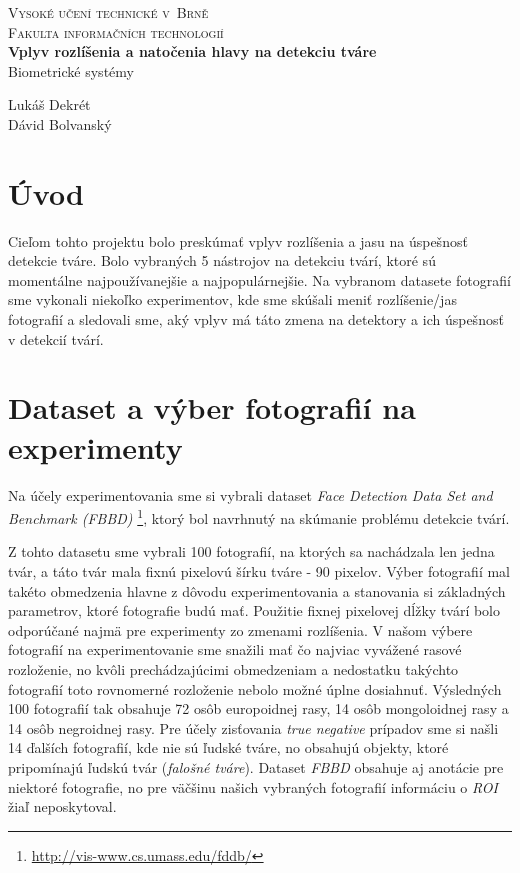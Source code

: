 \documentclass[]{article}
\begin{document}
	
	\begin{titlepage}
		\begin{center}
			\textsc{{\LARGE Vysoké učení technické v~Brně\\[0.3em]
					Fakulta informačních technologií}}\\
			{\Huge \textbf{Vplyv rozlíšenia a natočenia hlavy na detekciu tváre}\\[0.5em]}
			\Large{Biometrické systémy}
		\end{center}
		
		{\noindent \large Lukáš Dekrét\\Dávid Bolvanský}
	\end{titlepage}
	
	\section{Úvod}
	Cieľom tohto projektu bolo preskúmať vplyv rozlíšenia a jasu na úspešnosť detekcie tváre. Bolo vybraných 5 nástrojov na detekciu tvárí, ktoré sú momentálne najpoužívanejšie a najpopulárnejšie. Na vybranom datasete fotografií sme vykonali niekoľko experimentov, kde sme skúšali meniť rozlíšenie/jas fotografií a sledovali sme, aký vplyv má táto zmena na detektory a ich úspešnosť v detekcií tvárí.
	
	\section{Dataset a výber fotografií na experimenty}
	Na účely experimentovania sme si vybrali dataset \textit{Face Detection Data Set and Benchmark  (FBBD)} \footnote{\url{http://vis-www.cs.umass.edu/fddb/}}, ktorý bol navrhnutý na skúmanie problému detekcie tvárí.
	
	Z tohto datasetu sme vybrali 100 fotografií, na ktorých sa nachádzala len jedna tvár, a táto tvár mala fixnú pixelovú šírku tváre \-- 90 pixelov. Výber fotografií mal takéto obmedzenia hlavne z dôvodu experimentovania a stanovania si základných parametrov, ktoré fotografie budú mať. Použitie fixnej pixelovej dĺžky tvárí bolo odporúčané najmä pre experimenty zo zmenami rozlíšenia.
	V našom výbere fotografií na experimentovanie sme snažili mať čo najviac vyvážené rasové rozloženie, no kvôli prechádzajúcimi obmedzeniam a nedostatku takýchto fotografií toto rovnomerné rozloženie nebolo možné úplne dosiahnuť. Výsledných 100 fotografií tak obsahuje 72 osôb europoidnej rasy, 14 osôb mongoloidnej rasy a 14 osôb negroidnej rasy. Pre účely zisťovania \textit{true negative} prípadov sme si našli 14 ďalších fotografií, kde nie sú ľudské tváre, no obsahujú objekty, ktoré pripomínajú ľudskú tvár (\textit{falošné tváre}). Dataset \textit{FBBD} obsahuje aj anotácie pre niektoré fotografie, no pre väčšinu našich vybraných fotografií informáciu o \textit{ROI} žiaľ neposkytoval.
	
\end{document}
